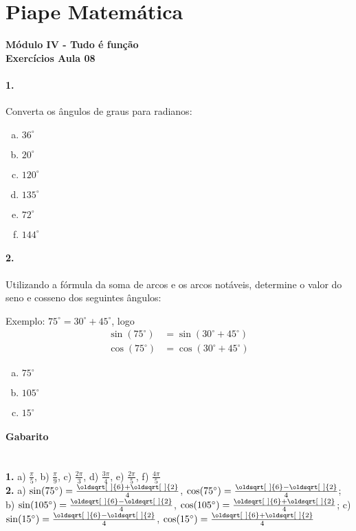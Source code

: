 \documentclass[a4paper,12pt]{article}
\renewcommand*{\sqrt}[2][\ ]{\oldsqrt[#1]{#2}}
\begin{document}
 
  
\section*{Piape Matemática} 
\textbf{Módulo IV - Tudo é função}\\
\textbf{Exercícios Aula 08}    

\begin{multicols}{2} 
 
\paragraph*{1.}  Converta os ângulos de graus para radianos:
\begin{enumerate}[a)]
\item $36^{\circ}$
\item $20^{\circ}$
\item $120^{\circ}$
\item $135^{\circ}$
\item $72^{\circ}$
\item $144^{\circ}$
\end{enumerate}
 
\paragraph*{2.} Utilizando a fórmula da soma de arcos e os arcos notáveis, determine o valor do seno e cosseno dos seguintes ângulos:
 
Exemplo: $75^{\circ} = 30^{\circ} + 45^{\circ}$, logo
\begin{align*}
    \sin(75^{\circ}) &= \sin(30^{\circ} + 45^{\circ}) \\
    \cos(75^{\circ}) &= \cos(30^{\circ} + 45^{\circ}) 
\end{align*} 

\begin{enumerate}[a)]
    \item $75^{\circ}$
    \item $105^{\circ}$
    \item $15^{\circ}$
\end{enumerate}

\end{multicols}

\vspace*{\fill}
{\footnotesize
\paragraph*{Gabarito} \hspace*{\fill}\\
\textbf{1.} a) $\frac{\pi}{5}$, b) $\frac{\pi}{9}$, c) $\frac{2\pi}{3}$, d) $\frac{3\pi}{4}$, e) $\frac{2\pi}{5}$, f) $\frac{4\pi}{5}$\\
\textbf{2.} a) $\sin(75^{\circ}) = \frac{\sqrt{6} + \sqrt{2}}{4}$, $\cos(75^{\circ}) = \frac{\sqrt{6} - \sqrt{2}}{4}$;
b) $\sin(105^{\circ}) = \frac{\sqrt{6} - \sqrt{2}}{4}$, $\cos(105^{\circ}) = \frac{\sqrt{6} + \sqrt{2}}{4}$;
c) $\sin(15^{\circ}) = \frac{\sqrt{6} - \sqrt{2}}{4}$, $\cos(15^{\circ}) = \frac{\sqrt{6} + \sqrt{2}}{4}$
}
\end{document}
